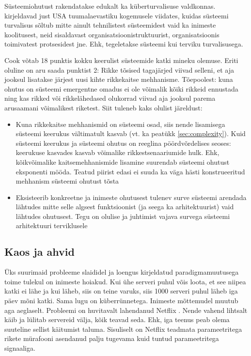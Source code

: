 \documentclass{article}
\begin{document}
Süsteemiohutust rakendatakse edukalt ka küberturvalisuse valdkonnas. \citeauthor{hbrcyber} kirjeldavad \citep{hbrcyber} just USA tuumalaevastiku kogemusele viidates, kuidas süsteemi turvalisus sõltub mitte ainult tehnilistest süsteemidest vaid ka inimeste koolitusest, neid sisaldavast organisatsioonistruktuurist, organisatsioonis toimivatest protsesidest jne. Ehk, tegeletakse süsteemi kui terviku turvalisusega.

Cook \citep{cook1998complex} võtab 18 punktis kokku keerulist süsteemide katki mineku olemuse. Eriti oluline on aru saada punktist 2: Rikke tõsised tagajärjed viivad selleni, et aja jooksul lisatakse järjest uusi kihte rikkekaitse mehhanisme. Tõepoolest: kuna ohutus on süsteemi emergentne omadus ei ole võimalik kõiki rikkeid ennustada ning kas rikked või rikkelähedased olukorrad viivad aja jooksul parema arusaamani võimalikest riketest. Siit tuleneb kaks olulist järeldust:
\begin{itemize}
	\item Kuna rikkekaitse mehhanismid on süsteemi osad, siis nende lisamisega süsteemi keerukus vältimatult kasvab (vt. ka peatükk \ref{sec:complexity}). Kuid süsteemi keerukus ja süsteemi ohutus on reeglina pöördvõrdelises seoses: keerukuse kasvades kasvab võimalike rikkestsenaariumide hulk. Ehk, kõikvõimalike kaitsemehhanismide lisamine suurendab süsteemi ohutust eksponenti mööda. Teatud piirist edasi ei suuda ka väga hästi konstrueeritud mehhanism süsteemi ohutust tõsta
	\item Eksisteerib konkreetne ja inimeste ohutusest tulenev surve süsteemi arendada lähtudes mitte selle algsest funktsioonist (ja seega ka arhitektuurist) vaid lähtudes ohutusest. Tegu on olulise ja juhtimist vajava survega süsteemi arhitektuuri terviklusele
\end{itemize} 

\subsection{Kaos ja ahvid}
Üks suurimaid probleeme slaididel ja loengus kirjeldatud paradigmamuutusega toime tulekul on inimeste hoiakud. Kui ühe serveri puhul võis loota, et see niipea katki ei lähe ja kui läheb, siis on teine varuks, siis 1000 serveri puhul läheb iga päev mõni katki. Sama lugu on küberrünnetega. Inimeste mõttemudel muutub aga aeglaselt. Probleemi on huvitavalt lahendanud Netflix \citep{monkey}. Nende vahend lihtsalt käib ja lülitab servereid välja, kõik teavad seda. Ehk, iga teenus peab olema suuteline sellist käitumist taluma. Sisuliselt on Netflix teadmata parameetritega rikete mürafooni asendanud palju tugevama kuid tuntud parameetritega signaaliga.   
\end{document}
